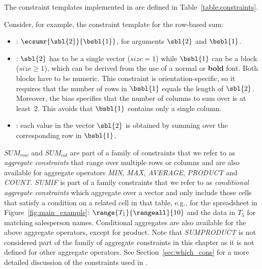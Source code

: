 The constraint templates implemented in \sname are defined in Table~\ref{table:constraints}.

\begin{example}
Consider, for example, the constraint template for the row-based sum:
\begin{itemize}
  \item \CName: $\ecsumr{\sbl{2}}{\bsbl{1}}$, for arguments $\sbl{2}$ and $\bsbl{1}$.
  
  \item \CSignature: $\sbl{2}$ has to be a single vector ($\textit{size}=1$) while $\bsbl{1}$ can be a block ($\textit{size} \geq 1$), which can be derived from the use of a normal or \textbf{bold} font.
  Both blocks have to be numeric.
  This constraint is orientation-specific, so it requires that the number of rows in $\bsbl{1}$ equals the length of $\sbl{2}$.
  Moreover, the bias specifies that the number of columns to sum over is at least~$2$. This avoids that $\bsbl{1}$ contains only a single column.
  
  \item \CFunction: each value in the vector $\sbl{2}$ is obtained by summing over the corresponding row in $\bsbl{1}$.
\end{itemize}

$\textit{SUM}_\textit{row}$ and $\textit{SUM}_\textit{col}$ are part of a family of constraints that we refer to as \emph{aggregate constraints} that range over multiple rows or columns and are also available for aggregate operators \textit{MIN}, \textit{MAX}, \textit{AVERAGE}, \textit{PRODUCT} and \textit{COUNT}.
\textit{SUMIF} is part of a family constraints that we refer to as \emph{conditional aggregate constraints} which aggregate over a vector and only include those cells that satisfy a condition on a related cell in that table, e.g., for the spreadsheet in Figure~\ref{fig:main_example}: $\range{T_1}{\rangeall}{10}$ and the data in $T_5$ for matching salesperson names.
Conditional aggregates are also available for the above aggregate operators, except for product. Note that \textit{SUMPRODUCT} is not considered part of the family of aggregate constraints in this chapter as it is not defined for other aggregate operators. See Section~\ref{sec:which_cons} for a more detailed discussion of the constraints used in \sname.
\end{example}


